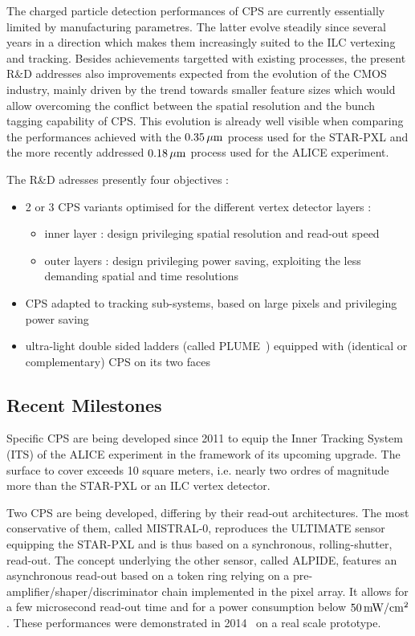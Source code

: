 The charged particle detection performances of CPS are
currently essentially limited by manufacturing parametres.
The latter evolve steadily since several years in a direction which makes
them increasingly suited to the ILC vertexing and tracking. Besides
achievements targetted with existing processes, the present R\&D
addresses also improvements expected from the evolution of the CMOS
industry, mainly driven by the trend towards smaller feature sizes which
would allow overcoming the conflict between the spatial resolution and the
bunch tagging capability of CPS. This evolution is already well visible
when comparing the performances achieved with the $\unit[0.35]{\mu m}$ process
used for the STAR-PXL and the more recently addressed $\unit[0.18]{\mu m}$ process
used for the ALICE experiment.


The R\&D adresses presently four objectives :
\begin{itemize}
\item 2 or 3 CPS variants optimised for the different vertex detector layers :
\begin{itemize}
\item inner layer : design privileging spatial resolution and read-out speed
\item outer layers : design privileging power saving, exploiting the
				less demanding spatial and time resolutions
\end{itemize}
\item CPS adapted to tracking sub-systems, based on large pixels and privileging
power saving
\item ultra-light double sided ladders (called PLUME~\cite{Nomerotski2011208})
equipped with (identical or complementary) CPS on its two faces
\end{itemize}


\subsection{Recent Milestones}
Specific CPS are being developed since 2011 to equip the Inner Tracking
System (ITS) of the ALICE experiment in the framework of its upcoming
upgrade. The surface to cover exceeds 10 square meters, i.e. nearly two
ordres of magnitude more than the STAR-PXL or an ILC vertex detector.

Two CPS are being developed, differing by their read-out architectures.
The most conservative of them, called MISTRAL-0, reproduces the ULTIMATE
sensor equipping the STAR-PXL and is thus based on a synchronous, rolling-shutter, read-out. The concept underlying the other sensor, called ALPIDE, features an asynchronous read-out based on a token ring relying on a pre-amplifier/shaper/discriminator chain implemented in the pixel array. It
allows for a few microsecond read-out time and for a power consumption below
$\unit[50]{mW/cm^2}$. These performances were demonstrated in 2014~\cite{1748-0221-10-03-C03030}
on a real scale prototype.

